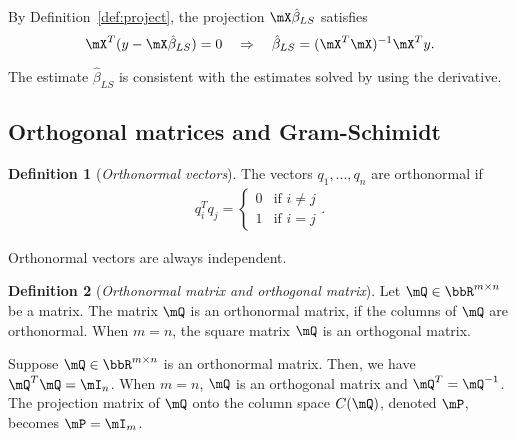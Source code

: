 \documentclass[11pt]{article}
\theoremstyle{plain}
\theoremstyle{definition}
\newtheorem{defn}{Definition}
\begin{document}
By Definition~\ref{def:project}, the projection $\mX \hat \beta_{LS}$ satisfies
\[ \mX^T( y - \mX \hat \beta_{LS} ) = 0 \quad \Rightarrow \quad \hat \beta_{LS} = (\mX^T \mX)^{-1} \mX^T y. \]

The estimate $\hat \beta_{LS}$ is consistent with the estimates solved by using the derivative. 

\subsection{Orthogonal matrices and Gram-Schimidt}
\begin{defn}[\textit{Orthonormal vectors}]\label{def:othronov}
	The vectors $q_1,...,q_n$ are orthonormal if
	\begin{align}
		q_i^T q_j = \begin{cases}
			0& \text{if } i\neq j\\
			1 & \text{if } i =  j
		\end{cases}.
	\end{align}
\end{defn}

Orthonormal vectors are always independent.

\begin{defn}[\textit{Orthonormal matrix and orthogonal matrix}]\label{def:orthonom}
	Let  $\mQ \in \bbR^{m \times n}$ be a matrix. The matrix $\mQ$ is an orthonormal matrix, if the columns of $\mQ$ are orthonormal. When $ m= n$, the square matrix $\mQ$ is an orthogonal matrix.
\end{defn}

Suppose $\mQ \in \bbR^{m \times n}$ is an orthonormal matrix. Then, we have $\mQ^T \mQ = \mI_n$.  When $m = n$, $\mQ$ is an orthogonal matrix and $\mQ^T = \mQ^{-1}$. The projection matrix of $\mQ$ onto the column space $C(\mQ)$, denoted $\mP$,  becomes $\mP = \mI_m$.
\end{document}
